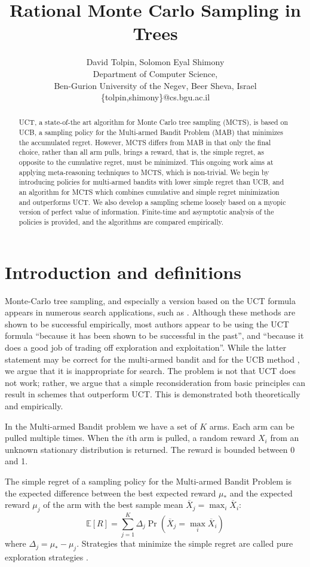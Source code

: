 \documentclass{article}
\title{Rational Monte Carlo Sampling in Trees}
\author {David Tolpin, Solomon Eyal Shimony \\
Department of Computer Science, \\
Ben-Gurion University of the Negev, Beer Sheva, Israel \\
\{tolpin,shimony\}@cs.bgu.ac.il}
\newcommand {\IE} {\ensuremath {\mathbb{E}}}
\begin{document}
\maketitle

\begin{abstract}
UCT, a state-of-the art algorithm for Monte Carlo tree sampling
(MCTS), is based on UCB, a sampling policy for the Multi-armed Bandit
Problem (MAB) that minimizes the accumulated regret. However, MCTS
differs from MAB in that only the final choice, rather than all arm
pulls, brings a reward, that is, the simple regret, as opposite to the
cumulative regret, must be minimized. This ongoing work aims at applying
meta-reasoning techniques to MCTS, which is non-trivial.
We begin by introducing policies for
multi-armed bandits with lower simple regret than UCB, and an
algorithm for MCTS which combines cumulative and simple regret
minimization and outperforms UCT. We also develop a sampling scheme loosely based
on a myopic version of perfect value of information.
Finite-time and asymptotic analysis of
the policies is provided, and the algorithms are compared empirically.
\end{abstract}

\section{Introduction and definitions}

Monte-Carlo tree sampling, and especially a version based on the
UCT formula \cite{Kocsis.uct} appears in numerous search applications,
such as \cite{Eyerich.ctp}. Although these methods are shown to be successful empirically,
most authors appear to be using the UCT formula ``because it has been shown
to be successful in the past'', and ``because it does a good job of
trading off exploration and exploitation''. While the latter statement may be
correct for the multi-armed bandit and for the UCB method \cite{Auer.ucb},
we argue that it is inappropriate for search. The problem is not that
UCT does not work; rather, we argue that a simple reconsideration from basic
principles can result in schemes that outperform UCT. This is demonstrated both
theoretically and empirically.

In the Multi-armed Bandit problem we have a set of $K$ arms. Each arm can be pulled
multiple times. When the $i$th arm is pulled, a random reward $X_i$
from an unknown stationary distribution is returned.  The reward is 
bounded between 0 and 1. 

The simple regret of a sampling policy for the Multi-armed Bandit
Problem is the expected difference between the best expected reward
$\mu_*$ and the expected reward $\mu_j$ of the arm with the best sample mean
$\overline X_j=\max_i\overline X_i$:
\begin{equation}
\label{eq:simple-regret}
\IE[R]=\sum_{j=1}^K\Delta_j\Pr(\overline X_j=\max_i\overline X_i)
\end{equation}
where $\Delta_j=\mu_*-\mu_j$.
Strategies that minimize the simple regret are called pure exploration
strategies \cite{Bubeck.pure}.
\end{document}
